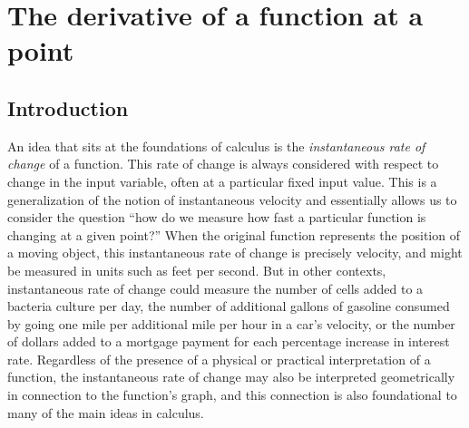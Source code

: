 \section{The derivative of a function at a point} \label{S:1.3.DerivativePt}

\vspace*{-14 pt}

\subsection*{Introduction}

An idea that sits at the foundations of calculus is the \emph{instantaneous rate of change} of a function.  This rate of change is always considered with respect to change in the input variable, often at a particular fixed input value.  This is a generalization of the notion of instantaneous velocity and essentially allows us to consider the question ``how do we measure how fast a particular function is changing at a given point?''  When the original function represents the position of a moving object, this instantaneous rate of change is precisely velocity, and might be measured in units such as feet per second.  But in other contexts, instantaneous rate of change could measure the number of cells added to a bacteria culture per day, the number of additional gallons of gasoline consumed by going one mile per additional mile per hour in a car's velocity, or the number of dollars added to a mortgage payment for each percentage increase in interest rate.  Regardless of the presence of a physical or practical interpretation of a function, the instantaneous rate of change may also be interpreted geometrically in connection to the function's graph, and this connection is also foundational to many of the main ideas in calculus.

